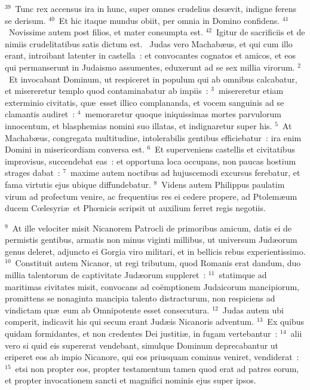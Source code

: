 ${}^{39}$~Tunc rex accensus ira in hunc, super omnes crudelius des\ae vit, indigne ferens se derisum.
${}^{40}$~Et hic itaque mundus obiit, per omnia in Domino confidens.
${}^{41}$~Novissime autem post filios, et mater consumpta est.
${}^{42}$~Igitur de sacrificiis et de nimiis crudelitatibus satis dictum est.
~Judas vero Machab\ae us, et qui cum illo erant, introibant latenter in castella~: et convocantes cognatos et amicos, et eos qui permanserunt in Judaismo assumentes, eduxerunt ad se sex millia virorum.
${}^{2}$~Et invocabant Dominum, ut respiceret in populum qui ab omnibus calcabatur, et misereretur templo quod contaminabatur ab impiis~:
${}^{3}$~misereretur etiam exterminio civitatis, qu\ae\ esset illico complananda, et vocem sanguinis ad se clamantis audiret~:
${}^{4}$~memoraretur quoque iniquissimas mortes parvulorum innocentum, et blasphemias nomini suo illatas, et indignaretur super his.
${}^{5}$~At Machab\ae us, congregata multitudine, intolerabilis gentibus efficiebatur~: ira enim Domini in misericordiam conversa est.
${}^{6}$~Et superveniens castellis et civitatibus improvisus, succendebat eas~: et opportuna loca occupans, non paucas hostium strages dabat~:
${}^{7}$~maxime autem noctibus ad hujuscemodi excursus ferebatur, et fama virtutis ejus ubique diffundebatur.
${}^{8}$~Videns autem Philippus paulatim virum ad profectum venire, ac frequentius res ei cedere propere, ad Ptolem\ae um ducem Cœlesyri\ae\ et Phœnicis scripsit ut auxilium ferret regis negotiis.


${}^{9}$~At ille velociter misit Nicanorem Patrocli de primoribus amicum, datis ei de permistis gentibus, armatis non minus viginti millibus, ut universum Jud\ae orum genus deleret, adjuncto ei Gorgia viro militari, et in bellicis rebus experientissimo.
${}^{10}$~Constituit autem Nicanor, ut regi tributum, quod Romanis erat dandum, duo millia talentorum de captivitate Jud\ae orum suppleret~:
${}^{11}$~statimque ad maritimas civitates misit, convocans ad co\"emptionem Judaicorum mancipiorum, promittens se nonaginta mancipia talento distracturum, non respiciens ad vindictam qu\ae\ eum ab Omnipotente esset consecutura.
${}^{12}$~Judas autem ubi comperit, indicavit his qui secum erant Jud\ae is Nicanoris adventum.
${}^{13}$~Ex quibus quidam formidantes, et non credentes Dei justiti\ae , in fugam vertebantur~:
${}^{14}$~alii vero si quid eis supererat vendebant, simulque Dominum deprecabantur ut eriperet eos ab impio Nicanore, qui eos priusquam cominus veniret, vendiderat~:
${}^{15}$~etsi non propter eos, propter testamentum tamen quod erat ad patres eorum, et propter invocationem sancti et magnifici nominis ejus super ipsos.


